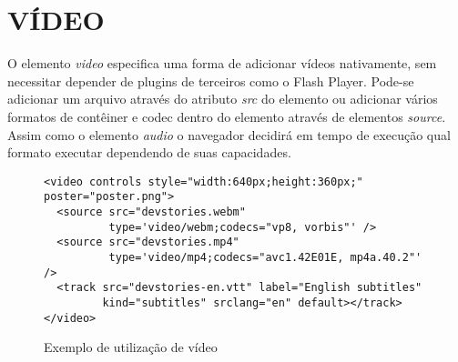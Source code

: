 \section{VÍDEO}
\begin{draft}

O elemento \textit{video} especifica uma forma de adicionar vídeos nativamente,
sem necessitar depender de plugins de terceiros como o Flash Player.
Pode-se adicionar um arquivo através do atributo \textit{src} do elemento
ou adicionar vários formatos de contêiner e codec dentro do elemento através
de elementos \textit{source}. Assim como o elemento \textit{audio} o navegador
decidirá em tempo de execução qual formato executar dependendo de suas capacidades.


\end{draft}
\begin{figure}
\centering
\begin{verbatim}
<video controls style="width:640px;height:360px;" poster="poster.png">
  <source src="devstories.webm" 
          type='video/webm;codecs="vp8, vorbis"' />
  <source src="devstories.mp4" 
          type='video/mp4;codecs="avc1.42E01E, mp4a.40.2"' />
  <track src="devstories-en.vtt" label="English subtitles" 
         kind="subtitles" srclang="en" default></track>
</video>
\end{verbatim}
\caption{Exemplo de utilização de vídeo}
\label{fig:video}
\end{figure}
